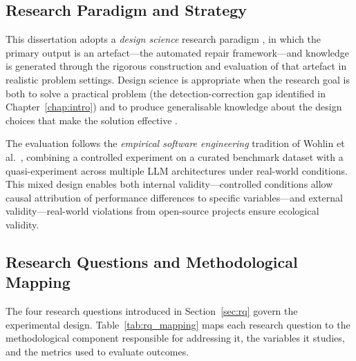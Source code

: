 \subsection{Research Paradigm and Strategy}

This dissertation adopts a \emph{design science} research paradigm
\cite{hevner2004design}, in which the primary output is an artefact—the
automated repair framework—and knowledge is generated through the rigorous
construction and evaluation of that artefact in realistic problem settings.
Design science is appropriate when the research goal is both to solve a
practical problem (the detection-correction gap identified in
Chapter~\ref{chap:intro}) and to produce generalisable knowledge about the
design choices that make the solution effective \cite{march1995design}.

The evaluation follows the \emph{empirical software engineering} tradition of
Wohlin et al.\ \cite{wohlin2012}, combining a controlled experiment on a
curated benchmark dataset with a quasi-experiment across multiple LLM
architectures under real-world conditions.  This mixed design enables both
internal validity—controlled conditions allow causal attribution of
performance differences to specific variables—and external validity—real-world
violations from open-source projects ensure ecological validity.

\subsection{Research Questions and Methodological Mapping}

The four research questions introduced in Section~\ref{sec:rq} govern the
experimental design.  Table~\ref{tab:rq_mapping} maps each research question
to the methodological component responsible for addressing it, the variables
it studies, and the metrics used to evaluate outcomes.

